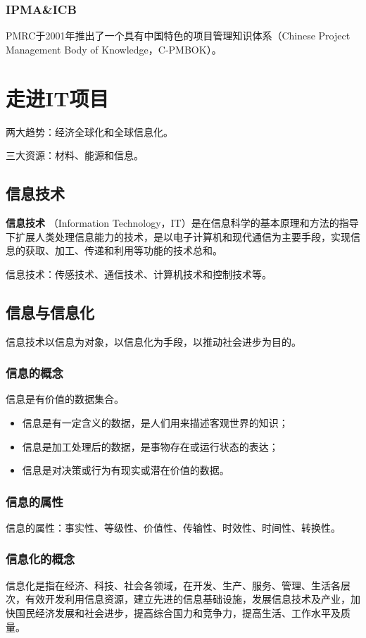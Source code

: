 \subsubsection*{IPMA\&ICB}
PMRC于2001年推出了一个具有中国特色的项目管理知识体系（Chinese Project Management Body of Knowledge，C-PMBOK）。

\section{走进IT项目}
两大趋势：经济全球化和全球信息化。
\par 三大资源：材料、能源和信息。
\subsection{信息技术}
\par \textbf{信息技术}
（Information Technology，IT）是在信息科学的基本原理和方法的指导下扩展人类处理信息能力的技术，是以电子计算机和现代通信为主要手段，实现信息的获取、加工、传递和利用等功能的技术总和。
\par 信息技术：传感技术、通信技术、计算机技术和控制技术等。
\subsection{信息与信息化}
信息技术以信息为对象，以信息化为手段，以推动社会进步为目的。 
\subsubsection*{信息的概念}
信息是有价值的数据集合。
\begin{itemize}
	\item 信息是有一定含义的数据，是人们用来描述客观世界的知识；
	\item 信息是加工处理后的数据，是事物存在或运行状态的表达；
	\item 信息是对决策或行为有现实或潜在价值的数据。
\end{itemize}
\subsubsection*{信息的属性}
信息的属性：事实性、等级性、价值性、传输性、时效性、时间性、转换性。
\subsubsection*{信息化的概念}
信息化是指在经济、科技、社会各领域，在开发、生产、服务、管理、生活各层次，有效开发利用信息资源，建立先进的信息基础设施，发展信息技术及产业，加快国民经济发展和社会进步，提高综合国力和竞争力，提高生活、工作水平及质量。
